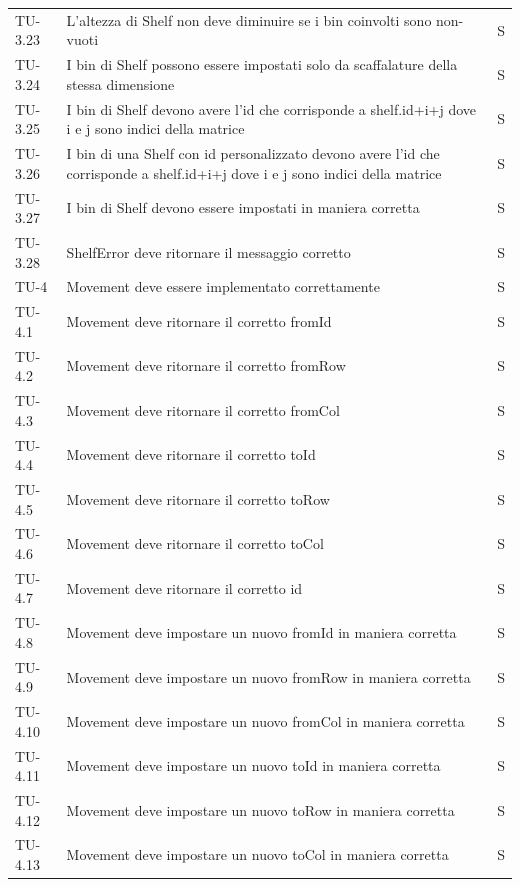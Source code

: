 \begin{xltabular}{0.9\textwidth}{X | p{0.6\textwidth} | p{0.1\textwidth} }
    TU-3.23 & L'altezza di Shelf non deve diminuire se i bin coinvolti sono non-vuoti & S\\
    TU-3.24 & I bin di Shelf possono essere impostati solo da scaffalature della stessa dimensione & S\\
    TU-3.25 & I bin di Shelf devono avere l'id che corrisponde a shelf.id+i+j dove i e j sono indici della matrice & S\\
    TU-3.26 & I bin di una Shelf con id personalizzato devono avere l'id che corrisponde a shelf.id+i+j dove i e j sono indici della matrice & S\\
    TU-3.27 & I bin di Shelf devono essere impostati in maniera corretta & S\\
    TU-3.28 & ShelfError deve ritornare il messaggio corretto & S\\

    TU-4 & Movement deve essere implementato correttamente & S\\
    TU-4.1 & Movement deve ritornare il corretto fromId & S\\
    TU-4.2 & Movement deve ritornare il corretto fromRow & S\\
    TU-4.3 & Movement deve ritornare il corretto fromCol & S\\
    TU-4.4 & Movement deve ritornare il corretto toId & S\\
    TU-4.5 & Movement deve ritornare il corretto toRow & S\\
    TU-4.6 & Movement deve ritornare il corretto toCol & S\\
    TU-4.7 & Movement deve ritornare il corretto id & S\\
    TU-4.8 & Movement deve impostare un nuovo fromId in maniera corretta & S\\
    TU-4.9 & Movement deve impostare un nuovo fromRow in maniera corretta & S\\
    TU-4.10 & Movement deve impostare un nuovo fromCol in maniera corretta & S\\
    TU-4.11 & Movement deve impostare un nuovo toId in maniera corretta & S\\
    TU-4.12 & Movement deve impostare un nuovo toRow in maniera corretta & S\\
    TU-4.13 & Movement deve impostare un nuovo toCol in maniera corretta & S\\


\end{xltabular}
